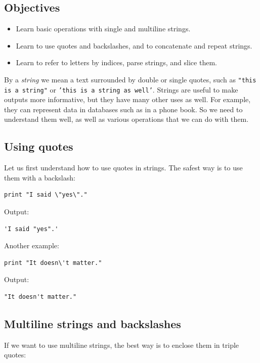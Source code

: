 \subsection{Objectives}

\begin{itemize}
\item Learn basic operations with single and multiline strings.
\item Learn to use quotes and backslashes, and to concatenate and repeat strings.
\item Learn to refer to letters by indices, parse strings, and slice them.
\end{itemize}
By a {\em string} we mean a text surrounded by double or single quotes, such as 
{\tt "this is a string"} or {\tt 'this is a string as well'}.
Strings are useful to make outputs more informative, but 
they have many other uses as well. For example, they can represent data 
in databases such as in a phone book. So we need to understand them well,
as well as various operations that we can do with them.

\subsection{Using quotes}

Let us first understand how to use quotes in strings. The safest way is to use 
them with a backslash:

\begin{verbatim}
print "I said \"yes\"."
\end{verbatim}
Output:

\begin{verbatim}
'I said "yes".'
\end{verbatim}
Another example:

\begin{verbatim}
print "It doesn\'t matter."
\end{verbatim}
Output:

\begin{verbatim}
"It doesn't matter."
\end{verbatim}

\subsection{Multiline strings and backslashes}

If we want to use multiline strings, the best way is to enclose them 
in triple quotes: 

